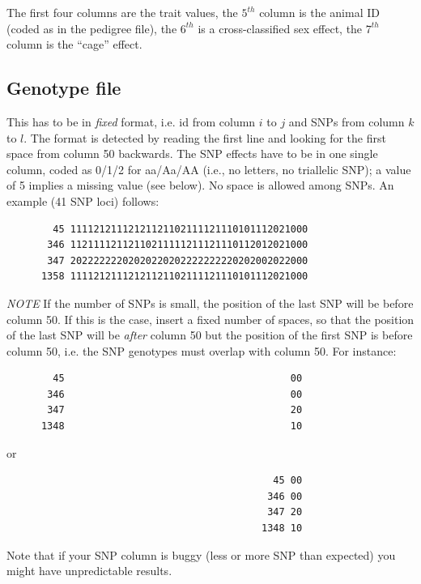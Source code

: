 \documentclass[a4paper,12pt,titlepage]{article}      %
\begin{document}
The first four columns are the trait values, the $5^{th}$ column is the animal ID (coded as in the pedigree file), the $6^{th}$ is a cross-classified sex effect, the $7^{th}$ column is the ``cage'' effect.


\subsection{Genotype file}

This has to be in \emph{fixed} format, i.e. id from column $i$ to $j$ and SNPs from column $k$ to $l$. The format is detected by reading the first line and looking for the first space from column 50 backwards.
The SNP effects have to be in one single column, coded as 0/1/2 for aa/Aa/AA (i.e., no letters, no triallelic SNP); a value of 5 implies a missing value (see below). No space is allowed among SNPs.  An example (41 SNP loci) follows:
{\small
\begin{verbatim}
        45 11112121112121121102111121110101112021000
       346 11211112112110211111211121110112012021000
       347 20222222202020220202222222220202002022000
      1358 11112121112121121102111121110101112021000
\end{verbatim}
}
\emph{\large NOTE} If the number of SNPs is small, the position of the last SNP will be before column 50. If this is the case, insert a fixed number of spaces, so that the position of the last SNP will be \emph{after} column 50 but the position of the first SNP is before column 50, i.e. the SNP genotypes must overlap with column 50. For instance:
{\small
\begin{verbatim}
        45                                       00
       346                                       00
       347                                       20
      1348                                       10
\end{verbatim}
}
or
{\small
\begin{verbatim}
                                              45 00
                                             346 00
                                             347 20
                                            1348 10
\end{verbatim}
}

Note that if your SNP column is buggy (less or more SNP than expected) you might have unpredictable results. 
\end{document}
